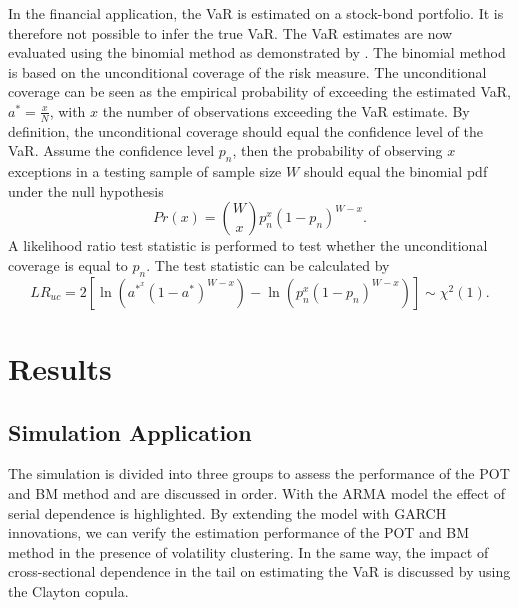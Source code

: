 \documentclass[a4paper,12pt]{article}
\theoremstyle{plain}
\begin{document}
In the financial application, the VaR is estimated on a stock-bond portfolio. It is therefore not possible to infer the true VaR. The VaR estimates are now evaluated using the binomial method as demonstrated by . The binomial method is based on the unconditional coverage of the risk measure. The unconditional coverage can be seen as the empirical probability of exceeding the estimated VaR, $a^*=\frac{x}{N}$, with $x$ the number of observations exceeding the VaR estimate. By definition, the unconditional coverage should equal the confidence level of the VaR. Assume the confidence level $p_n$, then the probability of observing $x$ exceptions in a testing sample of sample size $W$ should equal the binomial pdf under the null hypothesis \begin{equation}
    Pr\left(x\right) = {W\choose x}p_n^x\left(1-p_n\right)^{W-x}.
\end{equation}
\noindent A likelihood ratio test statistic is performed to test whether the unconditional coverage is equal to $p_n$. The test statistic can be calculated by
\begin{equation}
    LR_{uc} = 2\left[\ln{\left(a^{*^x}\left(1-a^*\right)^{W-x}\right)}-\ln{\left(p_n^x\left(1-p_n\right)^{W-x}\right)}\right]\sim \chi^2\left(1\right).
\end{equation}

\newpage

\section{Results}
\subsection{Simulation Application}

The simulation is divided into three groups to assess the performance of the POT and BM method and are discussed in order. With the ARMA model the effect of serial dependence is highlighted. By extending the model with GARCH innovations, we can verify the estimation performance of the POT and BM method in the presence of volatility clustering. In the same way, the impact of cross-sectional dependence in the tail on estimating the VaR is discussed by using the Clayton copula.\\
\end{document}
